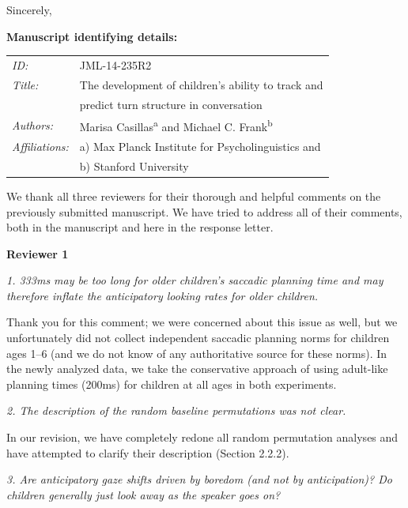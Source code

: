 \documentclass[11pt,a4paper]{letter} %
\begin{document}
\begin{letter}{}
\closing{Sincerely,}

\bigskip 
\bigskip 

\textbf{Manuscript identifying details:}

\begin{tabular}{ll}
\textit{ID:} & JML-14-235R2 \\
\textit{Title:} & The development of children's ability to track and \\
& predict turn structure in conversation \\
\textit{Authors:} & Marisa Casillas\textsuperscript{a} and Michael C. Frank\textsuperscript{b} \\
\textit{Affiliations:} & a) Max Planck Institute for Psycholinguistics and \\
& b) Stanford University
\end{tabular}

\newpage

\noindent We thank all three reviewers for their thorough and helpful comments on the previously submitted manuscript. We have tried to address all of their comments, both in the manuscript and here in the response letter.

\medskip

\noindent \textbf{Reviewer 1}

\noindent \textit{1. 333ms may be too long for older children's saccadic planning time and may therefore inflate the anticipatory looking rates for older children.}

\noindent Thank you for this comment; we were concerned about this issue as well, but we unfortunately did not collect independent saccadic planning norms for children ages 1--6 (and we do not know of any authoritative source for these norms). In the newly analyzed data, we take the conservative approach of using adult-like planning times (200ms) for children at all ages in both experiments.

\smallskip

\noindent \textit{2. The description of the random baseline permutations was not clear.}

\noindent In our revision, we have completely redone all random permutation analyses and have attempted to clarify their description (Section 2.2.2).

\smallskip

\noindent \textit{3. Are anticipatory gaze shifts driven by boredom (and not by anticipation)? Do children generally just look away as the speaker goes on?}


\end{letter}
\end{document}
